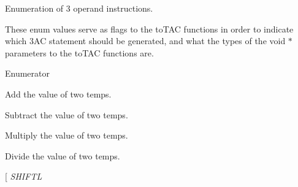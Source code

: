 Enumeration of 3 operand instructions. 

These enum values serve as flags to the to\-T\-A\-C functions in order to indicate which 3\-A\-C statement should be generated, and what the types of the void $\ast$ parameters to the to\-T\-A\-C functions are. \begin{Desc}
\item[Enumerator]\par
\begin{description}
\item[{\em 
\hypertarget{classTAC__Generator_ae032b80a215a10604c5273b65e7dab4ca53bbfc51b0f492dff408d99b0a5c6f1d}{A\-D\-D}\label{classTAC__Generator_ae032b80a215a10604c5273b65e7dab4ca53bbfc51b0f492dff408d99b0a5c6f1d}
}]Add the value of two temps. \item[{\em 
\hypertarget{classTAC__Generator_ae032b80a215a10604c5273b65e7dab4caf421605e870566ed803e041ea63fc13e}{S\-U\-B}\label{classTAC__Generator_ae032b80a215a10604c5273b65e7dab4caf421605e870566ed803e041ea63fc13e}
}]Subtract the value of two temps. \item[{\em 
\hypertarget{classTAC__Generator_ae032b80a215a10604c5273b65e7dab4ca234829d251fa1caafaf0ccf335d78ffd}{M\-U\-L\-T}\label{classTAC__Generator_ae032b80a215a10604c5273b65e7dab4ca234829d251fa1caafaf0ccf335d78ffd}
}]Multiply the value of two temps. \item[{\em 
\hypertarget{classTAC__Generator_ae032b80a215a10604c5273b65e7dab4caa5cb29c4a931157bf020a435ef6dc346}{D\-I\-V}\label{classTAC__Generator_ae032b80a215a10604c5273b65e7dab4caa5cb29c4a931157bf020a435ef6dc346}
}]Divide the value of two temps. \item[{\em 
\hypertarget{classTAC__Generator_ae032b80a215a10604c5273b65e7dab4ca8f0f0d5e222181f2f8ad11c2931d394f}{S\-H\-I\-F\-T\-L}\label{classTAC__Generator_ae032b80a215a10604c5273b65e7dab4ca8f0f0d5e222181f2f8ad11c2931d394f}
}
\end{description}
\end{Desc}
